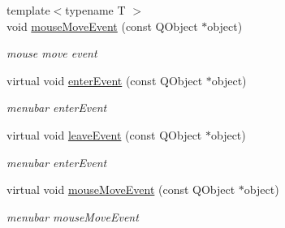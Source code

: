 \begin{DoxyCompactItemize}
{\footnotesize template$<$typename T $>$ }\\void \hyperlink{class_menu_bar_data_v2_a4d65a7aaea20646d5f5afc410e258681}{mouse\+Move\+Event} (const Q\+Object $\ast$object)
\begin{DoxyCompactList}\small\item\em mouse move event \end{DoxyCompactList}\item 
\mbox{\label{class_menu_bar_data_v2_aa468760d86f96d432c544ee9f4157cae}} 
virtual void \hyperlink{class_menu_bar_data_v2_aa468760d86f96d432c544ee9f4157cae}{enter\+Event} (const Q\+Object $\ast$object)
\begin{DoxyCompactList}\small\item\em menubar enter\+Event \end{DoxyCompactList}\item 
\mbox{\label{class_menu_bar_data_v2_a8cdd9d295c27cb777d6aa6c81db07c9f}} 
virtual void \hyperlink{class_menu_bar_data_v2_a8cdd9d295c27cb777d6aa6c81db07c9f}{leave\+Event} (const Q\+Object $\ast$object)
\begin{DoxyCompactList}\small\item\em menubar enter\+Event \end{DoxyCompactList}\item 
\mbox{\label{class_menu_bar_data_v2_ac981bc5bab47cf7ca06f09a28cd760e7}} 
virtual void \hyperlink{class_menu_bar_data_v2_ac981bc5bab47cf7ca06f09a28cd760e7}{mouse\+Move\+Event} (const Q\+Object $\ast$object)
\begin{DoxyCompactList}\small\item\em menubar mouse\+Move\+Event \end{DoxyCompactList}\end{DoxyCompactItemize}
